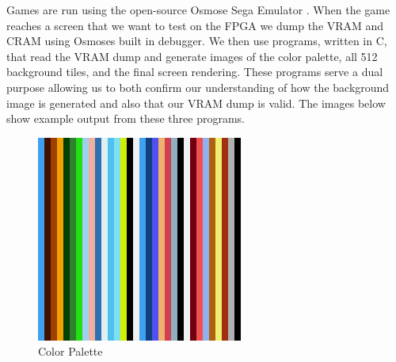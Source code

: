 \documentclass{article}
\begin{document}
Games are run using the open-source Osmose Sega Emulator \cite{osmose}. When
the game reaches a screen that we want to test on the FPGA we dump the VRAM and
CRAM using Osmoses built in debugger. We then use programs, written in C, that
read the VRAM dump and generate images of the color palette, all 512 background
tiles, and the final screen rendering.  These programs serve a dual purpose
allowing us to both confirm our understanding of how the background image is
generated and also that our VRAM dump is valid. The images below show example
output from these three programs.
\vfill
\begin{figure}[H]
    \centering
    \begin{minipage}[H]{0.45\linewidth}
        \centering
        \includegraphics[width=\textwidth]{../images/palette.png}
        \caption{Color Palette}
        \label{fig:palette}
    \end{minipage}
    \hfill
    \begin{minipage}[H]{0.45\linewidth}
        \centering

\end{minipage}
\end{figure}
\end{document}

